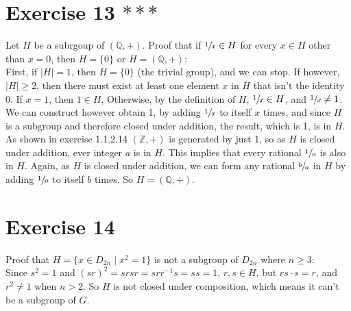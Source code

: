 \documentclass[12pt]{article}
\newcommand{\Z}{\mathbb{Z}}
\newcommand{\Q}{\mathbb{Q}}
\begin{document}
    \section*{Exercise 13 $***$}
    Let $H$ be a subrgoup of $(\Q, +)$.
    Proof that if $\sfrac{1}{x} \in H$ for every $x \in H$ other than $x = 0$,
    then $H = \{0\}$ or $H = (\Q, +)$: \\
    First, if $|H| = 1$, then $H = \{0\}$ (the trivial group),
    and we can stop.
    If however, $|H| \geqslant 2$,
    then there must exist at least one element $x$ in $H$ that isn't the
    identity 0.
    If $x = 1$, then $1 \in H$,
    Otherwise, by the definition of $H$, $\sfrac{1}{x} \in H$,
    and $\sfrac{1}{x} \neq 1$.
    We can construct however obtain 1,
    by adding $\sfrac{1}{x}$ to itself $x$ times,
    and since $H$ is a subgroup and therefore closed under addition,
    the result, which is 1, is in $H$.
    As shown in exercise 1.1.2.14 $(\Z, +)$ is generated by just 1,
    so as $H$ is closed under addition,
    ever integer $a$ is in $H$.
    This implies that every rational $\sfrac{1}{a}$ is also in $H$.
    Again, as $H$ is closed under addition,
    we can form any rational $\sfrac{b}{a}$ in $H$
    by adding $\sfrac{1}{a}$ to itself $b$ times.
    So $H = (\Q, +)$.


    \section*{Exercise 14}
    Proof that $H = \{x \in D_{2n} \mid x^2 = 1\}$
    is not a subgroup of $D_{2n}$ where $n \geqslant 3$: \\
    Since $s^2 = 1$ and $(sr)^2 = srsr = srr^{-1}s = ss = 1$,
    $r, s \in H$,
    but $rs \cdot s = r$, and $r^2 \neq 1$ when $n > 2$.
    So $H$ is not closed under composition,
    which means it can't be a subgroup of $G$.
\end{document}
